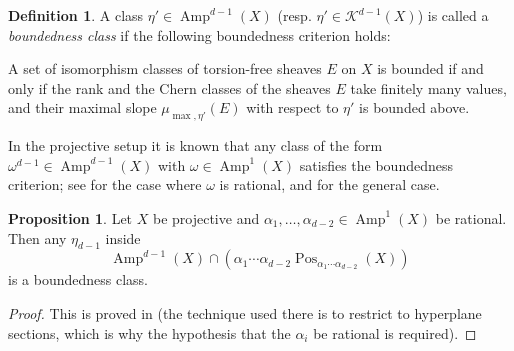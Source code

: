 \documentclass[a4,reqno]{amsart}
\theoremstyle{definition}
\newtheorem{proposition}[theorem]{Proposition}
\newtheorem{definition}[theorem]{Definition}
\def\cK{\mathcal K}
\DeclareMathOperator{\Amp}{Amp}
\DeclareMathOperator{\Pos}{Pos}
\numberwithin{equation}{section}
\begin{document}
\begin{definition}\label{def:boundednessclass}
    A class $\eta' \in \Amp^{d-1}(X)$ (resp. $\eta' \in \cK^{d-1}(X)$) is called a {\em boundedness class} if the following boundedness criterion holds:
    
    A set of isomorphism classes of torsion-free sheaves $E$ on $X$ is bounded if and only if the rank and the Chern classes of the sheaves $E$ take finitely many values, and their maximal slope $\mu_{\max,\eta'}(E)$ with respect to $\eta'$ is bounded above.
\end{definition}

In the projective setup it is known that any class of the form $\omega^{d-1} \in \Amp^{d-1}(X)$ with $\omega \in \Amp^1(X)$ satisfies the boundedness criterion; see \cite[Theorem 3.3.7]{HL} for the case where $\omega$ is rational, and \cite[Proposition 7.20]{joyce2021enumerative} for the general case.



\begin{proposition}\label{prop:boundedness_pairs}
Let $X$ be projective and $\alpha_1,\ldots,\alpha_{d-2}\in\Amp^1(X)$ be rational. Then any $\eta_{d-1}$ inside
    $$\Amp^{d-1}(X)\cap (\alpha_1 \cdots \alpha_{d-2}\Pos_{\alpha_1 \cdots \alpha_{d-2}}(X))$$ is a boundedness class.
\end{proposition}
\begin{proof}
This is proved in \cite[Theorem 1.4]{PavelRossToma} (the technique used there is to restrict to hyperplane sections, which is why the hypothesis that the $\alpha_i$ be rational is required).
\end{proof}
\end{document}
